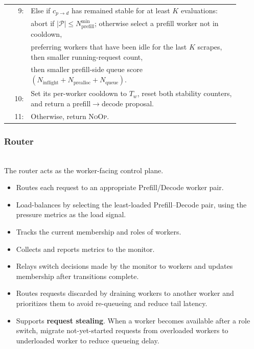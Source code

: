 \begin{algorithm}[t]
\begin{tabular}{@{}r p{0.9\linewidth}@{}}
9: & Else if $c_{p\rightarrow d}$ has remained stable for at least $K$ evaluations: \\
   & \hspace*{1.8em}abort if $|\mathcal{P}| \le N_{\mathrm{prefill}}^{\min}$; otherwise select a prefill worker not in cooldown, \\
   & \hspace*{1.8em}preferring workers that have been idle for the last $K$ scrapes, then smaller running-request count, \\
   & \hspace*{1.8em}then smaller prefill-side queue score $(N_{\mathrm{inflight}} + N_{\mathrm{prealloc}} + N_{\mathrm{queue}})$. \\
10: & \hspace*{1.8em}Set its per-worker cooldown to $T_w$, reset both stability counters, and return a prefill$\rightarrow$decode proposal. \\
11: & Otherwise, return \textsc{NoOp}. \\
\end{tabular}
\end{algorithm}


\subsubsection{Router}
\noindent\\
The router acts as the worker-facing control plane.
\begin{itemize}
  \item Routes each request to an appropriate Prefill/Decode worker pair.
  \item Load-balances by selecting the least-loaded Prefill--Decode pair, using the pressure metrics as the load signal.
  \item Tracks the current membership and roles of workers.
  \item Collects and reports metrics to the monitor.
  \item Relays switch decisions made by the monitor to workers and updates membership after transitions complete.
  \item Routes requests discarded by draining workers to another worker and prioritizes them to avoid re-queueing and reduce tail latency.
  \item Supports \textbf{request stealing}. When a worker becomes available after a role switch, migrate not-yet-started requests from overloaded workers to underloaded worker to reduce queueing delay.
\end{itemize}

